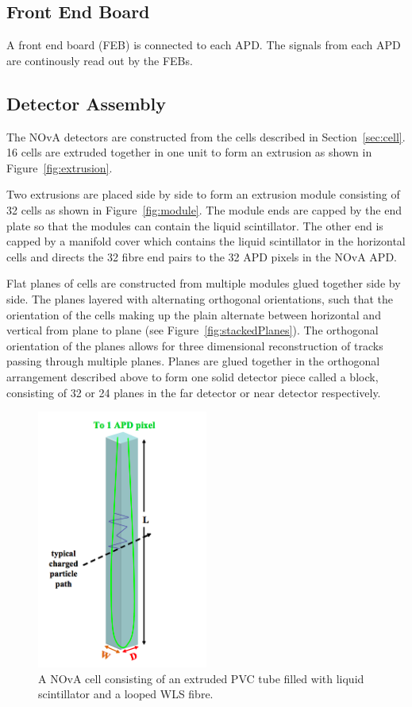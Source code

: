 \subsection{Front End Board}

A front end board (FEB) is connected to each APD. The
signals from each APD are continously read out by the FEBs.


\subsection{Detector Assembly} \label{sec:detAssembly}

The NOvA detectors are constructed from the cells described
in Section~\ref{sec:cell}. 16 cells are extruded together in one unit
to form an extrusion as shown in Figure~\ref{fig:extrusion}. 

Two extrusions are placed side by side to form an extrusion module
consisting of 32 cells as shown in Figure~\ref{fig:module}. The
module ends are capped by the end plate so that the modules can
contain the liquid scintillator. The other end is capped by a manifold
cover which contains the liquid scintillator in the horizontal cells
and directs the 32 fibre end pairs to the 32 APD pixels in the NOvA
APD. 

Flat planes of cells are constructed from multiple modules glued
together side by side. 
The planes layered with alternating orthogonal
orientations, such that the orientation of the cells making up the
plain alternate between horizontal and vertical from plane to plane (see
Figure~\ref{fig:stackedPlanes}). The orthogonal
orientation of the planes allows for three dimensional reconstruction
of tracks passing through multiple planes. Planes are glued together
in the orthogonal arrangement described above to form one solid
detector piece called a block, consisting of 32 or 24 planes in the
far detector or near detector respectively.

\begin{figure}
  \centering
  \includegraphics[width=0.5\textwidth]{../../img/det/gen/nova_cell.png}
  \caption{A NOvA cell consisting of an extruded
    PVC tube filled with liquid scintillator and a looped WLS fibre.}
  \label{fig:cell}
\end{figure}


